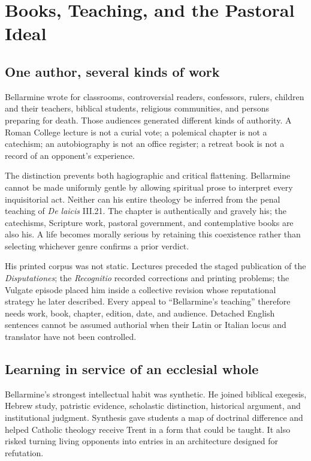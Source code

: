 \section{Books, Teaching, and the Pastoral Ideal}

\subsection{One author, several kinds of work}

Bellarmine wrote for classrooms, controversial readers, confessors, rulers,
children and their teachers, biblical students, religious communities, and
persons preparing for death.  Those audiences generated different kinds of
authority.  A Roman College lecture is not a curial vote; a polemical chapter
is not a catechism; an autobiography is not an office register; a retreat book
is not a record of an opponent's experience.

The distinction prevents both hagiographic and critical flattening.  Bellarmine
cannot be made uniformly gentle by allowing spiritual prose to interpret every
inquisitorial act.  Neither can his entire theology be inferred from the penal
teaching of \emph{De laicis} III.21.  The chapter is authentically and gravely
his; the catechisms, Scripture work, pastoral government, and contemplative
books are also his.  A life becomes morally serious by retaining this
coexistence rather than selecting whichever genre confirms a prior verdict.

His printed corpus was not static.  Lectures preceded the staged publication
of the \emph{Disputationes}; the \emph{Recognitio} recorded corrections and
printing problems; the Vulgate episode placed him inside a collective revision
whose reputational strategy he later described.  Every appeal to ``Bellarmine's
teaching'' therefore needs work, book, chapter, edition, date, and audience.
Detached English sentences cannot be assumed authorial when their Latin or
Italian locus and translator have not been controlled.

\subsection{Learning in service of an ecclesial whole}

Bellarmine's strongest intellectual habit was synthetic.  He joined biblical
exegesis, Hebrew study, patristic evidence, scholastic distinction, historical
argument, and institutional judgment.  Synthesis gave students a map of
doctrinal difference and helped Catholic theology receive Trent in a form that
could be taught.  It also risked turning living opponents into entries in an
architecture designed for refutation.

